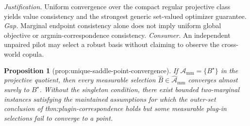 \documentclass{article}
\newtheorem{proposition}{Proposition}
\begin{document}
\par\smallskip\noindent \textit{Justification.} Uniform convergence over the compact regular projective class yields value consistency and the strongest generic set-valued optimizer guarantee. \textit{Gap.} Marginal endpoint consistency alone does not imply uniform global objective or argmin-correspondence consistency. \textit{Consumer.} An independent unpaired pilot may select a robust basis without claiming to observe the cross-world copula.

\begin{proposition}[prop:unique-saddle-point-convergence]\label{prop:unique-saddle-point-convergence}
If \(\mathcal A_{\mathrm{mm}}=\{B^\star\}\) in the projective quotient, then every measurable selection \(\widehat B\in\widehat{\mathcal A}_{\mathrm{mm}}\) converges almost surely to \(B^\star\).  Without the singleton condition, there exist bounded two-marginal instances satisfying the maintained assumptions for which the outer-set conclusion of thm:plugin-correspondence holds but some measurable plug-in selections fail to converge to a point.
\end{proposition}
\end{document}
